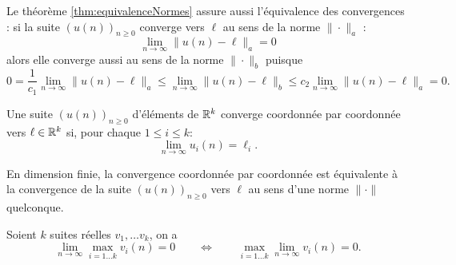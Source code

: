 
\remark
Le théorème \ref{thm:equivalenceNormes} assure aussi l'équivalence des convergences : si la suite $(u(n))_{n \geq 0}$ converge vers $\ell$ au sens de la norme $\|\cdot\|_a$ :
$$
\lim_{n \to \infty} \|u(n) - \ell\|_a = 0
$$
alors elle converge aussi au sens de la norme $\|\cdot\|_b$ puisque
$$
0 = \frac1{c_1} \lim_{n \to \infty} \|u(n) - \ell\|_a
\leq \lim_{n \to \infty} \|u(n) - \ell\|_b \leq
c_2 \lim_{n \to \infty} \|u(n) - \ell\|_a = 0.
$$

\begin{definition}
  Une suite $(u(n))_{n \geq 0}$ d'éléments de $\mathbb{R}^k$ converge coordonnée par coordonnée vers $\ell \in \mathbb{R}^k$ si, pour chaque $1 \leq i \leq k$:
  $$
  \lim_{n \to \infty} u_i(n) = \ell_i.
  $$
\end{definition}

\begin{proposition} \label{prop:convergenceParCoordonnee}
  En dimension finie, la convergence coordonnée par coordonnée est équivalente à la convergence de la suite $(u(n))_{n \geq 0}$ vers $\ell$ au sens d'une norme $\|\cdot\|$ quelconque.
\end{proposition}

\begin{lemma} \label{lem:inversionLimiteMaximum}
  Soient $k$ suites réelles $v_1, \dots v_k$, on a
  $$
  \lim_{n \to \infty} \max_{i=1 \dots k} v_i(n) = 0
  \qquad \Leftrightarrow \qquad
  \max_{i=1 \dots k} \lim_{n \to \infty} v_i(n) = 0.
  $$
\end{lemma}

